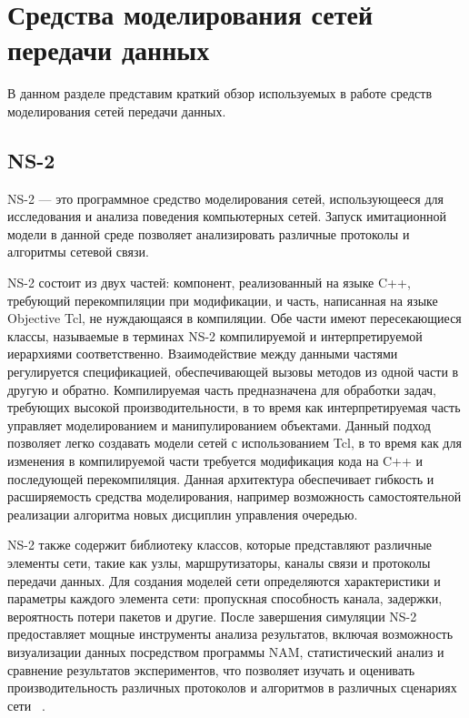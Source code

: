 
\chapter{Средства моделирования сетей передачи данных}
\label{chap1}

В данном разделе представим краткий обзор используемых в работе средств моделирования сетей
передачи данных.

\section{NS-2}
\label{chap1:sec1}

NS-2 — это программное средство моделирования
сетей, использующееся для исследования и анализа поведения
компьютерных сетей.  Запуск имитационной модели в данной среде
позволяет анализировать различные протоколы и алгоритмы сетевой связи.

NS-2 состоит из двух частей: компонент, реализованный на языке C++, 
требующий перекомпиляции при модификации, и часть, написанная на языке Objective Tcl,
не нуждающаяся в компиляции. Обе части имеют пересекающиеся классы, называемые в 
терминах NS-2 компилируемой и интерпретируемой иерархиями соответственно. 
Взаимодействие между данными частями регулируется спецификацией, обеспечивающей вызовы 
методов из одной части в другую и обратно. Компилируемая часть предназначена для обработки задач, 
требующих высокой производительности, в то время как интерпретируемая часть управляет 
моделированием и манипулированием объектами. Данный подход позволяет легко создавать модели сетей 
с использованием Tcl, в то время как для изменения в компилируемой части требуется модификация 
кода на C++ и последующей перекомпиляция. Данная архитектура обеспечивает гибкость и расширяемость 
средства моделирования, например возможность самостоятельной реализации алгоритма новых дисциплин управления очередью. 

NS-2 также содержит библиотеку классов, которые представляют различные элементы сети,
такие как узлы, маршрутизаторы, каналы связи и протоколы передачи
данных. Для создания моделей сети определяются характеристики и
параметры каждого элемента сети: пропускная способность канала,
задержки, вероятность потери пакетов и другие. После завершения
симуляции NS-2 предоставляет мощные инструменты анализа результатов,
включая возможность визуализации данных посредством программы NAM, 
статистический анализ и сравнение результатов экспериментов, что позволяет 
изучать и оценивать производительность различных протоколов и алгоритмов 
в различных сценариях сети ~\cite{NS2-1, NS2-2}.

